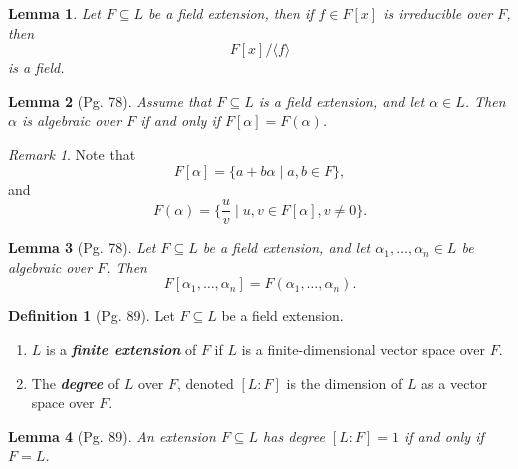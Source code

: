 \documentclass[leqno]{article}
\newtheorem{lemma}{Lemma}
\theoremstyle{definition}
\newtheorem{definition}{Definition}
\theoremstyle{remark}
\newtheorem*{remark}{Remark}
\theoremstyle{definition}
\begin{document}
    \begin{lemma}\label{lem:4}
        Let $F\subseteq L$ be a field extension, then if $f\in F[x]$ is irreducible over $F$, then 
            \begin{equation*}
                F[x]/\langle f\rangle
            \end{equation*}
        is a field.
    \end{lemma}
    \begin{lemma}[Pg. 78]\label{lem:5}
        Assume that $F\subseteq L$ is a field extension, and let $\alpha\in L$. Then $\alpha$ is algebraic over $F$ if and only if $F[\alpha]=F(\alpha)$.
    \end{lemma}
    \begin{remark}
        Note that 
            \begin{equation*}
                F[\alpha]=\{a+b\alpha\mid a,b\in F\},
            \end{equation*}
        and 
            \begin{equation*}
                F(\alpha)=\{\frac{u}{v}\mid u,v\in F[\alpha], v\neq 0\}.
            \end{equation*}
    \end{remark}
    \begin{lemma}[Pg. 78]\label{lem:6}
        Let $F\subseteq L$ be a field extension, and let $\alpha_1,\dots,\alpha_n\in L$ be algebraic over $F$. Then 
            \begin{equation*}
                F[\alpha_1,\dots,\alpha_n]=F(\alpha_1,\dots,\alpha_n).
            \end{equation*}
    \end{lemma}
    \begin{definition}[Pg. 89]\label{def:4}
        Let $F\subseteq L$ be a field extension.
            \begin{enumerate}[label=\normalfont{(\alph*)}]
                \item $L$ is a \textbf{\textit{finite extension}} of $F$ if $L$ is a finite-dimensional vector space over $F$.
                \item The \textbf{\textit{degree}} of $L$ over $F$, denoted $[L\colon F]$ is the dimension of $L$ as a vector space over $F$.
            \end{enumerate}
    \end{definition}
    \begin{lemma}[Pg. 89]\label{lem:7}
        An extension $F\subseteq L$ has degree $[L\colon F]=1$ if and only if $F=L$.
    \end{lemma}
\end{document}
